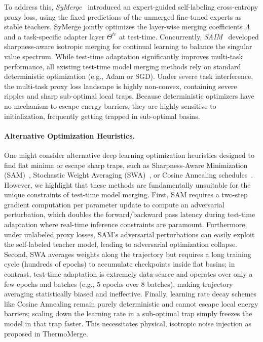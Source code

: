 To address this, \emph{SyMerge}~\cite{jung2025symerge} introduced an expert-guided self-labeling cross-entropy proxy loss, using the fixed predictions of the unmerged fine-tuned experts as stable teachers.
SyMerge jointly optimizes the layer-wise merging coefficients $\Lambda$ and a task-specific adapter layer $\Theta^{tr}$ at test-time.
Concurrently, \emph{SAIM}~\cite{foret2020sharpness} developed sharpness-aware isotropic merging for continual learning to balance the singular value spectrum.
While test-time adaptation significantly improves multi-task performance, all existing test-time model merging methods rely on standard deterministic optimization (e.g., Adam or SGD).
Under severe task interference, the multi-task proxy loss landscape is highly non-convex, containing severe ripples and sharp sub-optimal local traps.
Because deterministic optimizers have no mechanism to escape energy barriers, they are highly sensitive to initialization, frequently getting trapped in sub-optimal basins.

\paragraph{Alternative Optimization Heuristics.} One might consider alternative deep learning optimization heuristics designed to find flat minima or escape sharp traps, such as Sharpness-Aware Minimization (SAM)~\cite{foret2020sharpness}, Stochastic Weight Averaging (SWA)~\cite{izmailov2018averaging}, or Cosine Annealing schedules~\cite{loshchilov2016sgdr}.
However, we highlight that these methods are fundamentally unsuitable for the unique constraints of test-time model merging.
First, SAM requires a two-step gradient computation per parameter update to compute an adversarial perturbation, which doubles the forward/backward pass latency during test-time adaptation where real-time inference constraints are paramount.
Furthermore, under unlabeled proxy losses, SAM's adversarial perturbations can easily exploit the self-labeled teacher model, leading to adversarial optimization collapse.
Second, SWA averages weights along the trajectory but requires a long training cycle (hundreds of epochs) to accumulate checkpoints inside flat basins; in contrast, test-time adaptation is extremely data-scarce and operates over only a few epochs and batches (e.g., 5 epochs over 8 batches), making trajectory averaging statistically biased and ineffective.
Finally, learning rate decay schemes like Cosine Annealing remain purely deterministic and cannot escape local energy barriers; scaling down the learning rate in a sub-optimal trap simply freezes the model in that trap faster.
This necessitates physical, isotropic noise injection as proposed in ThermoMerge.

